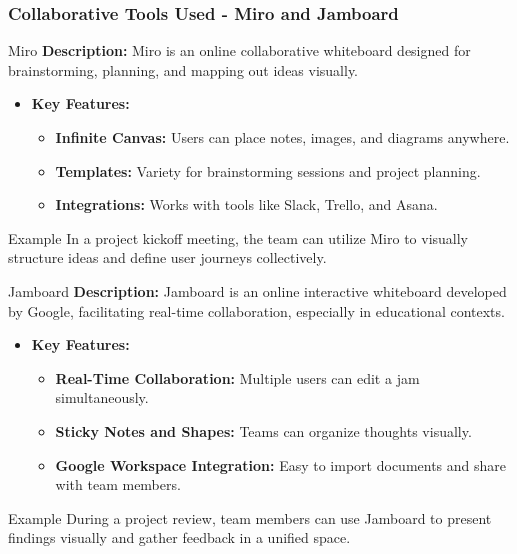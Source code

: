 \documentclass[aspectratio=169]{beamer}
\begin{document}
\begin{frame}[fragile]
    \frametitle{Collaborative Tools Used - Miro and Jamboard}
    \begin{block}{Miro}
        \textbf{Description:} Miro is an online collaborative whiteboard designed for brainstorming, planning, and mapping out ideas visually.
    \end{block}
    \begin{itemize}
        \item \textbf{Key Features:}
        \begin{itemize}
            \item \textbf{Infinite Canvas:} Users can place notes, images, and diagrams anywhere.
            \item \textbf{Templates:} Variety for brainstorming sessions and project planning.
            \item \textbf{Integrations:} Works with tools like Slack, Trello, and Asana.
        \end{itemize}
    \end{itemize}
    \begin{block}{Example}
        In a project kickoff meeting, the team can utilize Miro to visually structure ideas and define user journeys collectively.
    \end{block}
    
    \begin{block}{Jamboard}
        \textbf{Description:} Jamboard is an online interactive whiteboard developed by Google, facilitating real-time collaboration, especially in educational contexts.
    \end{block}
    \begin{itemize}
        \item \textbf{Key Features:}
        \begin{itemize}
            \item \textbf{Real-Time Collaboration:} Multiple users can edit a jam simultaneously.
            \item \textbf{Sticky Notes and Shapes:} Teams can organize thoughts visually.
            \item \textbf{Google Workspace Integration:} Easy to import documents and share with team members.
        \end{itemize}
    \end{itemize}
    \begin{block}{Example}
        During a project review, team members can use Jamboard to present findings visually and gather feedback in a unified space.
    \end{block}
\end{frame}
\end{document}
